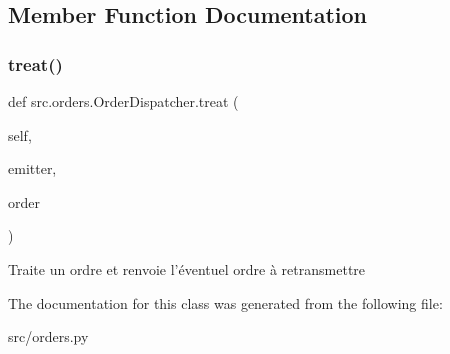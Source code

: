 \subsection{Member Function Documentation}
\hypertarget{classsrc_1_1orders_1_1_order_dispatcher_a4cd2412ef1f923180f2f1c00de132869}{}\label{classsrc_1_1orders_1_1_order_dispatcher_a4cd2412ef1f923180f2f1c00de132869} 
\subsubsection{\texorpdfstring{treat()}{treat()}}
{\footnotesize\ttfamily def src.\+orders.\+Order\+Dispatcher.\+treat (\begin{DoxyParamCaption}\item[{}]{self,  }\item[{}]{emitter,  }\item[{}]{order }\end{DoxyParamCaption})}

\begin{DoxyVerb}Traite un ordre et renvoie l'éventuel ordre à retransmettre \end{DoxyVerb}
 

The documentation for this class was generated from the following file\+:\begin{DoxyCompactItemize}
\item 
src/orders.\+py\end{DoxyCompactItemize}
